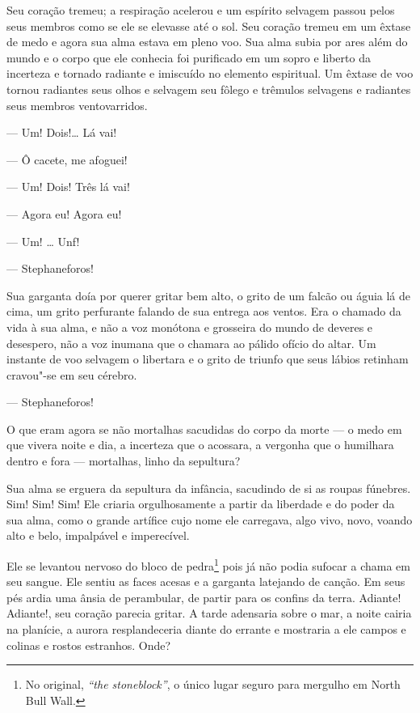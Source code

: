 Seu coração tremeu; a respiração acelerou e um espírito selvagem passou
pelos seus membros como se ele se elevasse até o sol. Seu coração
tremeu em um êxtase de medo e agora sua alma estava em pleno voo. Sua
alma subia por ares além do mundo e o corpo que ele conhecia foi
purificado em um sopro e liberto da incerteza e tornado radiante e
imiscuído no elemento espiritual. Um êxtase de voo tornou radiantes
seus olhos e selvagem seu fôlego e trêmulos selvagens e radiantes seus
membros ventovarridos.                                                

 --- Um! Dois!\ldots{} Lá vai!

 --- Ô cacete, me afoguei!

 --- Um! Dois! Três lá vai!

 --- Agora eu! Agora eu!

 --- Um! \ldots{} Unf!

 --- Stephaneforos!

Sua garganta doía por querer gritar bem alto, o grito de um falcão ou
águia lá de cima, um grito perfurante falando de sua entrega aos
ventos. Era o chamado da vida à sua alma, e não a voz monótona e
grosseira do mundo de deveres e desespero, não a voz inumana que o
chamara ao pálido ofício do altar. Um instante de voo selvagem o
libertara e o grito de triunfo que seus lábios retinham cravou"-se em seu
cérebro.

 --- Stephaneforos!

O que eram agora se não mortalhas sacudidas do corpo da morte --- o medo
em que vivera noite e dia, a incerteza que o acossara, a vergonha que o
humilhara dentro e fora --- mortalhas, linho da sepultura?

Sua alma se erguera da sepultura da infância, sacudindo de si as roupas
fúnebres. Sim! Sim! Sim! Ele criaria orgulhosamente a partir da
liberdade e do poder da sua alma, como o grande artífice cujo nome ele
carregava, algo vivo, novo, voando alto e belo, impalpável e
imperecível.

Ele se levantou nervoso do bloco de pedra\footnote{ No original,
\textit{“the stoneblock”}, o único lugar seguro para mergulho em North
Bull Wall.} pois já não podia sufocar a chama em seu sangue. Ele sentiu
as faces acesas e a garganta latejando de canção.		
Em seus pés ardia uma ânsia de perambular, de partir para os confins
da terra. Adiante! Adiante!, seu coração parecia gritar. A tarde
adensaria sobre o mar, a noite cairia na planície, a aurora
resplandeceria diante do errante e mostraria a ele campos e colinas e
rostos estranhos. Onde?


